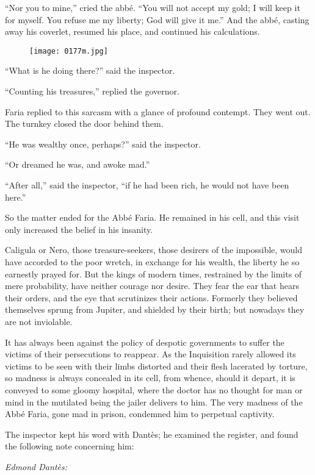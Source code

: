“Nor you to mine,” cried the abbé. “You will not accept my gold; I will
keep it for myself. You refuse me my liberty; God will give it me.” And
the abbé, casting away his coverlet, resumed his place, and continued
his calculations.

\begin{figure}[ht]
\texttt{[image: 0177m.jpg]}
\end{figure}

“What is he doing there?” said the inspector.

“Counting his treasures,” replied the governor.

Faria replied to this sarcasm with a glance of profound contempt. They
went out. The turnkey closed the door behind them.

“He was wealthy once, perhaps?” said the inspector.

“Or dreamed he was, and awoke mad.”

“After all,” said the inspector, “if he had been rich, he would not
have been here.”

So the matter ended for the Abbé Faria. He remained in his cell, and
this visit only increased the belief in his insanity.

Caligula or Nero, those treasure-seekers, those desirers of the
impossible, would have accorded to the poor wretch, in exchange for his
wealth, the liberty he so earnestly prayed for. But the kings of modern
times, restrained by the limits of mere probability, have neither
courage nor desire. They fear the ear that hears their orders, and the
eye that scrutinizes their actions. Formerly they believed themselves
sprung from Jupiter, and shielded by their birth; but nowadays they are
not inviolable.

It has always been against the policy of despotic governments to suffer
the victims of their persecutions to reappear. As the Inquisition
rarely allowed its victims to be seen with their limbs distorted and
their flesh lacerated by torture, so madness is always concealed in its
cell, from whence, should it depart, it is conveyed to some gloomy
hospital, where the doctor has no thought for man or mind in the
mutilated being the jailer delivers to him. The very madness of the
Abbé Faria, gone mad in prison, condemned him to perpetual captivity.

The inspector kept his word with Dantès; he examined the register, and
found the following note concerning him:

\textit{Edmond Dantès:}

